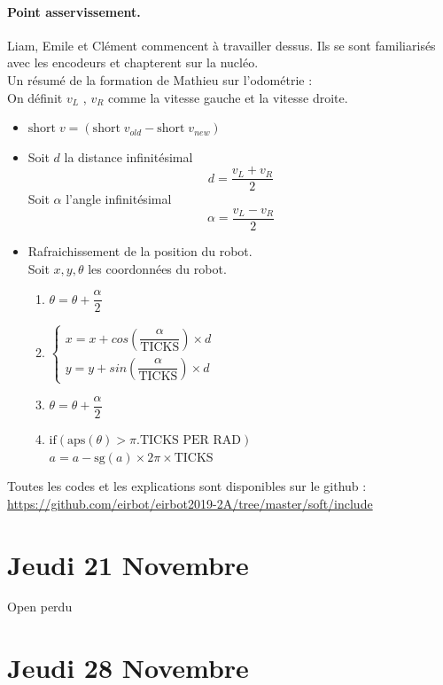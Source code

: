 \documentclass[a4paper,10pt]{report}
\begin{document}
\begin{spacing}{1.5}
\paragraph*{Point asservissement.}
Liam, Emile et Clément commencent à travailler dessus. Ils se sont familiarisés avec les encodeurs et chapterent sur la nucléo.\\
Un résumé de la formation de Mathieu sur l'odométrie : \\
On définit $v_L$ , $v_R$ comme la vitesse gauche et la vitesse droite.
\begin{itemize}
  \item $\text{short} \; v = (\text{short} \; v_{old} - \text{short} \; v_{new})$ %
  \item Soit $d$ la distance infinitésimal $$d = \dfrac{v_L+v_R}{2}$$ Soit $\alpha$ l'angle infinitésimal $$\alpha = \dfrac{v_L-v_R}{2}$$
  \item Rafraichissement de la position du robot. \\ Soit $x,y,\theta$ les coordonnées du robot. \begin{enumerate}
  \item $\theta = \theta + \dfrac{\alpha}{2}$
  \item $\begin{cases} x = x + cos(\dfrac{\alpha}{\text{TICKS}}) \times d \\ y = y + sin(\dfrac{\alpha}{\text{TICKS}}) \times d \end{cases}$
  \item $\theta = \theta + \dfrac{\alpha}{2}$
  \item $\text{if}(\text{aps}(\theta) > \pi.\text{TICKS PER RAD})$ \\ $a=a-\text{sg}(a)\times 2 \pi \times \text{TICKS}$
  \end{enumerate}
\end{itemize}
Toutes les codes et les explications sont disponibles sur le github : \url{https://github.com/eirbot/eirbot2019-2A/tree/master/soft/include}

\newpage
\section*{Jeudi 21 Novembre}
Open perdu

\newpage
\section*{Jeudi 28 Novembre}

\end{spacing}
\end{document}
